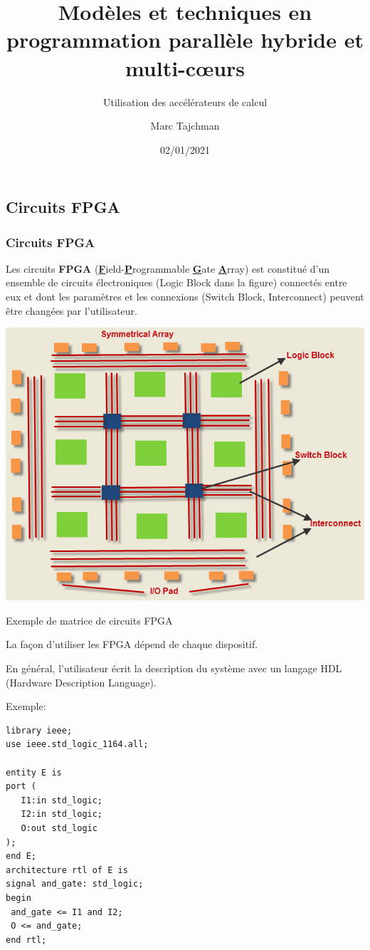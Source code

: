 \documentclass[usenames,dvipsnames]{beamer}
\title{Modèles et techniques en programmation parallèle hybride et multi-c\oe urs}
\subtitle{Utilisation des accélérateurs de calcul}
\author{Marc Tajchman}\institute{CEA - DEN/DM2S/STMF/LMES}
\date{02/01/2021}
\begin{document}
\begin{frame}
\titlepage
\end{frame}

\large
\begin{frame}
\section{Circuits FPGA}
\frametitle{Circuits FPGA}

Les circuits {\bfseries FPGA} (\underline{\bfseries F}ield-\underline{\bfseries P}rogrammable \underline{\bfseries G}ate \underline{\bfseries A}rray) est constitué d'un ensemble de circuits électroniques (Logic Block dans la figure) connectés entre eux et dont les  paramètres et les connexions (Switch Block, Interconnect) peuvent être changées par l'utilisateur.

\begin{center}
	\includegraphics[scale=0.3]{../../Images/FPGA}
	
	Exemple de matrice de circuits FPGA
\end{center}
\end{frame}

\begin{frame}[fragile]
La façon d'utiliser les FPGA dépend de chaque dispositif. 
\vfill
	
En général, l'utilisateur écrit la description du système avec un langage HDL (Hardware Description Language).
\vfill


Exemple:
\begin{minipage}[t]{0.55\textwidth}
\small
\begin{lstlisting}[style=vhdl]
library ieee;
use ieee.std_logic_1164.all;

entity E is
port (
   I1:in std_logic;
   I2:in std_logic;
   O:out std_logic
);
end E;
architecture rtl of E is
signal and_gate: std_logic;
begin
 and_gate <= I1 and I2;
 O <= and_gate;
end rtl;
\end{lstlisting}\end{minipage}
\vfill

\end{frame}
\end{document}
